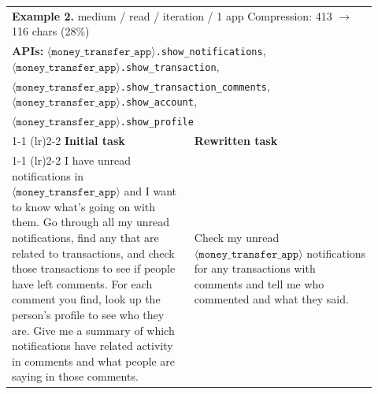 \begin{table}[t]
\begin{tabular}{p{0.46\linewidth} p{0.46\linewidth}}
\multicolumn{2}{l}{\textbf{Example 2.} medium / read / iteration / 1 app \quad\quad Compression: 413 $\rightarrow$ 116 chars (28\%)} \\
\multicolumn{2}{p{0.94\linewidth}}{\textbf{APIs:} $\langle \texttt{money\_transfer\_app} \rangle$\texttt{.show\_notifications}, $\langle \texttt{money\_transfer\_app} \rangle$\texttt{.show\_transaction},}\\
\multicolumn{2}{p{0.94\linewidth}}{$\langle \texttt{money\_transfer\_app} \rangle$\texttt{.show\_transaction\_comments}, $\langle \texttt{money\_transfer\_app} \rangle$\texttt{.show\_account},}\\
\multicolumn{2}{p{0.94\linewidth}}{$\langle \texttt{money\_transfer\_app} \rangle$\texttt{.show\_profile}} \\
\cmidrule(lr){1-1} \cmidrule(lr){2-2}
\textbf{Initial task} & \textbf{Rewritten task} \\
\cmidrule(lr){1-1} \cmidrule(lr){2-2}
I have unread notifications in $\langle \texttt{money\_transfer\_app} \rangle$ and I want to know what's going on with them. Go through all my unread notifications, find any that are related to transactions, and check those transactions to see if people have left comments. For each comment you find, look up the person's profile to see who they are. Give me a summary of which notifications have related activity in comments and what people are saying in those comments.
&
Check my unread $\langle \texttt{money\_transfer\_app} \rangle$ notifications for any transactions with comments and tell me who commented and what they said. \\


\end{tabular}
\end{table}
